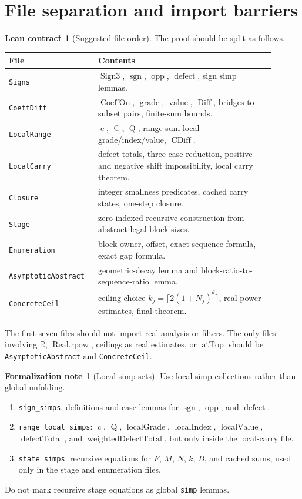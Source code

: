 \documentclass[11pt]{article}
\theoremstyle{definition}
\newtheorem{formalnote}[definition]{Formalization note}
\newtheorem{contract}[definition]{Lean contract}
\theoremstyle{plain}
\theoremstyle{remark}
\newcommand{\R}{\mathbb{R}}
\newcommand{\sgn}{\operatorname{sgn}}
\newcommand{\opp}{\operatorname{opp}}
\newcommand{\defect}{\operatorname{defect}}
\newcommand{\CoeffOn}{\operatorname{CoeffOn}}
\newcommand{\Grade}{\operatorname{grade}}
\newcommand{\Val}{\operatorname{value}}
\newcommand{\Diff}{\operatorname{Diff}}
\newcommand{\celt}{\operatorname{c}}
\newcommand{\Cblock}{\operatorname{C}}
\newcommand{\Qfun}{\operatorname{Q}}
\newcommand{\CDiff}{\operatorname{CDiff}}
\newcommand{\LGrade}{\operatorname{localGrade}}
\newcommand{\LIndex}{\operatorname{localIndex}}
\newcommand{\LVal}{\operatorname{localValue}}
\newcommand{\DTotal}{\operatorname{defectTotal}}
\newcommand{\WDTotal}{\operatorname{weightedDefectTotal}}
\newcommand{\atTop}{\operatorname{atTop}}
\begin{document}
\section{File separation and import barriers}

\begin{contract}[Suggested file order]
The proof should be split as follows.
\begin{center}
\begin{tabular}{>{\raggedright\arraybackslash}p{0.28\linewidth} >{\raggedright\arraybackslash}p{0.62\linewidth}}
File & Contents \\ \hline
\verb|Signs| & \(\operatorname{Sign3}\), \(\sgn\), \(\opp\), \(\defect\), sign simp lemmas.\\
\verb|CoeffDiff| & \(\CoeffOn\), \(\Grade\), \(\Val\), \(\Diff\), bridges to subset pairs, finite-sum bounds.\\
\verb|LocalRange| & \(\celt\), \(\Cblock\), \(\Qfun\), range-sum local grade/index/value, \(\CDiff\).\\
\verb|LocalCarry| & defect totals, three-case reduction, positive and negative shift impossibility, local carry theorem.\\
\verb|Closure| & integer smallness predicates, cached carry states, one-step closure.\\
\verb|Stage| & zero-indexed recursive construction from abstract legal block sizes.\\
\verb|Enumeration| & block owner, offset, exact sequence formula, exact gap formula.\\
\verb|AsymptoticAbstract| & geometric-decay lemma and block-ratio-to-sequence-ratio lemma.\\
\verb|ConcreteCeil| & ceiling choice \(k_j=\lceil2(1+N_j)^\theta\rceil\), real-power estimates, final theorem.
\end{tabular}
\end{center}
The first seven files should not import real analysis or filters.  The only files involving \(\R\), \(\operatorname{Real.rpow}\), ceilings as real estimates, or \(\atTop\) should be \verb|AsymptoticAbstract| and \verb|ConcreteCeil|.
\end{contract}

\begin{formalnote}[Local simp sets]
Use local simp collections rather than global unfolding.
\begin{enumerate}[label=(\roman*), leftmargin=*]
\item \verb|sign_simps|: definitions and case lemmas for \(\sgn\), \(\opp\), and \(\defect\).
\item \verb|range_local_simps|: \(\celt\), \(\Qfun\), \(\LGrade\), \(\LIndex\), \(\LVal\), \(\DTotal\), and \(\WDTotal\), but only inside the local-carry file.
\item \verb|state_simps|: recursive equations for \(F\), \(M\), \(N\), \(k\), \(B\), and cached sums, used only in the stage and enumeration files.
\end{enumerate}
Do not mark recursive stage equations as global \verb|simp| lemmas.
\end{formalnote}
\end{document}
